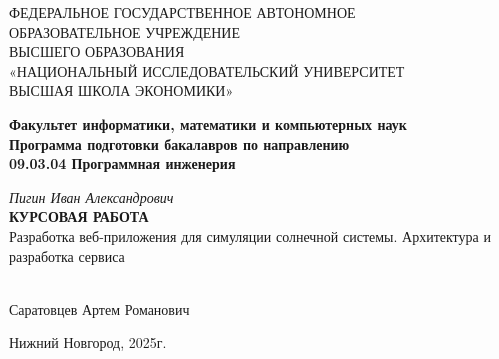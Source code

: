 \documentclass[14pt]{extarticle}
\begin{document}
\begin{titlepage}

\begin{center}

\normalsize

\normalsize{ФЕДЕРАЛЬНОЕ ГОСУДАРСТВЕННОЕ АВТОНОМНОЕ\\ОБРАЗОВАТЕЛЬНОЕ УЧРЕЖДЕНИЕ\\ВЫСШЕГО ОБРАЗОВАНИЯ\\«НАЦИОНАЛЬНЫЙ ИССЛЕДОВАТЕЛЬСКИЙ УНИВЕРСИТЕТ\\

ВЫСШАЯ ШКОЛА ЭКОНОМИКИ»}

\vfill

\textbf{Факультет информатики, математики и компьютерных наук}\\[3mm]

\textbf{Программа подготовки бакалавров по направлению\\09.03.04 Программная инженерия}

\vfill

\textit{Пигин Иван Александрович}\\[3mm]

\textbf{КУРСОВАЯ РАБОТА}\\[10mm]

\normalsize{Разработка веб-приложения для симуляции солнечной системы. Архитектура и разработка сервиса}

\end{center}

\vfill
\newlength{\ML}
\hfill
\begin{minipage}{0.4\textwidth}
\\[2mm]
Саратовцев Артем Романович
\end{minipage}%
\vfill
\begin{center}

Нижний Новгород, 2025г.

\end{center}

\end{titlepage}
	
	
	
	
\end{document}
